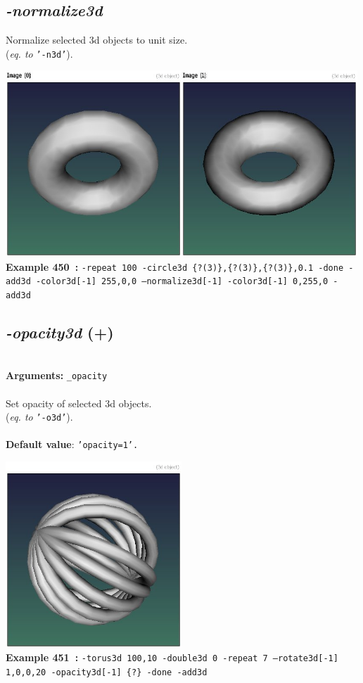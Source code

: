 \documentclass[a4paper,11pt,twoside]{book}
\begin{document}
\subsection{\emph{-normalize3d} }\vspace*{-0.5em}
Normalize selected 3d objects to unit size.
~\\(\emph{eq. to} {\small \texttt{'-n3d'}}).
\begin{center}\includegraphics[keepaspectratio=true,height=7cm,width=\textwidth]{img/gmic_def450.jpg}\\
{\footnotesize \textbf{Example 450~:} \texttt{-repeat 100 -circle3d \{?(3)\},\{?(3)\},\{?(3)\},0.1 -done -add3d -color3d[-1] 255,0,0 --normalize3d[-1] -color3d[-1] 0,255,0 -add3d}}
\end{center}

\subsection{\emph{-opacity3d} (+)}\vspace*{-0.5em}
~\\\textbf{Arguments: } 
{\small \texttt{\_opacity}}\\~\\
Set opacity of selected 3d objects.
~\\(\emph{eq. to} {\small \texttt{'-o3d'}}).
~\\~\\\textbf{Default value}: {\small \texttt{'opacity=1'.}}
\begin{center}\includegraphics[keepaspectratio=true,height=7cm,width=\textwidth]{img/gmic_def451.jpg}\\
{\footnotesize \textbf{Example 451~:} \texttt{-torus3d 100,10 -double3d 0 -repeat 7 --rotate3d[-1] 1,0,0,20 -opacity3d[-1] \{?\} -done -add3d}}
\end{center}
\end{document}
